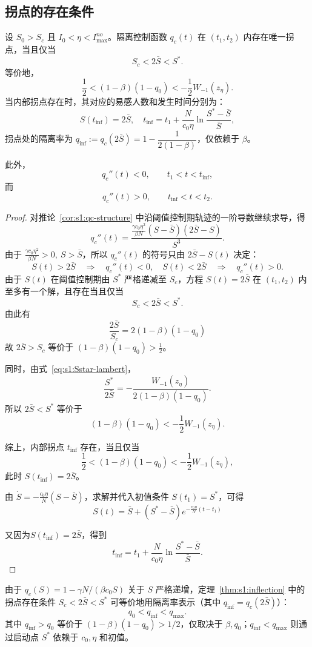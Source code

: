 \documentclass[lang=cn,a4paper,newtx]{elegantpaper}
\numberwithin{equation}{section}
\theoremstyle{plain}
\newcommand{\qinf}{q_{\mathrm{inf}}}
\begin{document}
\subsection{拐点的存在条件}
\begin{theorem}\label{thm:s1:inflection}
    设 $S_0>S_c$ 且 $I_0<\eta<I_{\max}^{no}$。隔离控制函数 $q_c(t)$ 在 $(t_1,t_2)$ 内存在唯一拐点，当且仅当
    \[
    S_c<2\bar S<S^*.
    \]
    等价地，
    \[
    \frac{1}{2}
    <(1-\beta)(1-q_0)
    <-\frac{1}{2}W_{-1}(z_\eta).
    \]
    当内部拐点存在时，其对应的易感人数和发生时间分别为：
    \[
    S(t_{\mathrm{inf}})=2\bar S,\quad
    t_{\mathrm{inf}}
    =
    t_1+\frac{N}{c_0\eta}\ln\frac{S^*-\bar S}{\bar S},
    \]
    拐点处的隔离率为 $\qinf:=q_c(2\bar S)=1-\dfrac{1}{2(1-\beta)}$，仅依赖于 $\beta$。

    此外，
    \[
    q_c''(t)<0,
    \qquad t_1<t<t_{\mathrm{inf}},
    \]
    而
    \[
    q_c''(t)>0,
    \qquad t_{\mathrm{inf}}<t<t_2.
    \]
\end{theorem}
\begin{proof}
    对推论~\ref{cor:s1:qc-structure} 中沿阈值控制期轨迹的一阶导数继续求导，得
    \[
    q_c''(t)
    =
    \frac{\frac{\gamma c_0\eta^2}{\beta N}(S-\bar S)(2\bar S-S)}{S^3}.
    \]
    由于 \(\frac{\gamma c_0\eta^2}{\beta N}>0,\ S>\bar S\)，所以 $q_c''(t)$ 的符号只由 $2\bar S-S(t)$ 决定：
    \[
    S(t)>2\bar S
    \quad\Rightarrow\quad
    q_c''(t)<0,
    \quad S(t)<2\bar S
    \quad\Rightarrow\quad
    q_c''(t)>0.
    \]
    由于 $S(t)$ 在阈值控制期由 $S^*$ 严格递减至 $S_c$，方程 $S(t)=2\bar S$ 在 $(t_1,t_2)$ 内至多有一个解，且存在当且仅当
    \[
    S_c<2\bar S<S^*.
    \]
    由此有
    \[
    \frac{2\bar{S}}{S_c}=2(1-\beta)(1-q_0)
    \]
    故 $2\bar S>S_c$ 等价于 $(1-\beta)(1-q_0)>\frac{1}{2}$。
    
    同时，由式~\eqref{eq:s1:Sstar-lambert}，
    \[
    \frac{S^*}{2\bar S}
    =
    -\frac{W_{-1}(z_\eta)}
    {2(1-\beta)(1-q_0)}.
    \]
    所以 $2\bar S<S^*$ 等价于
    \[
    (1-\beta)(1-q_0)<-\frac{1}{2}W_{-1}(z_\eta).
    \]

    综上，内部拐点 $t_{\mathrm{inf}}$ 存在，当且仅当
    \[
    \frac{1}{2}
    <(1-\beta)(1-q_0)
    <-\frac{1}{2}W_{-1}(z_\eta),
    \]
    此时 $S(t_{\mathrm{inf}})=2\bar S$。
    
    由 $\dot{S}=-\frac{c_0\eta}{N}(S-\bar S)$，求解并代入初值条件 $S(t_1)=S^*$，可得
    \[
    S(t)=\bar S+(S^*-\bar S)
    e^{-\frac{c_0\eta}{N}(t-t_1)}
    \]

    又因为\(S(t_{\mathrm{inf}})=2\bar S\)，得到
    \[
    t_{\mathrm{inf}}
    =
    t_1+
    \frac{N}{c_0\eta}
    \ln\frac{S^*-\bar S}{\bar S}.
    \]
\end{proof}
由于 $q_c(S)=1-\gamma N/(\beta c_0 S)$ 关于 $S$ 严格递增，定理~\ref{thm:s1:inflection} 中的拐点存在条件 $S_c<2\bar S<S^*$ 可等价地用隔离率表示（其中 $\qinf=q_c(2\bar S)$）：
\begin{equation}
q_0<\qinf<q_{\max}.
\label{eq:s1:inflection-exist}
\end{equation}
其中 $\qinf>q_0$ 等价于 $(1-\beta)(1-q_0)>1/2$，仅取决于 $\beta,q_0$；$\qinf<q_{\max}$ 则通过启动点 $S^*$ 依赖于 $c_0,\eta$ 和初值。
\end{document}
